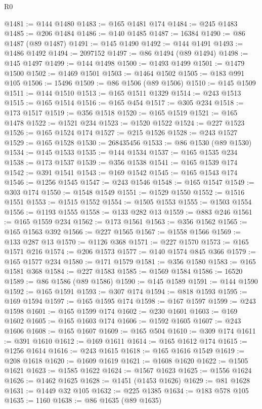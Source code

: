 \begin{lexlean}{R0}
\begin{coremodule}
@1481 := @144 @1480
@1483 := @165 @1481 @174
@1484 := @245 @1483
@1485 := @206 @1484
@1486 := @140 @1485
@1487 := 16384
@1490 := @86 @1487 (@89 @1487)
@1491 := @145 @1490
@1492 := @144 @1491
@1493 := @1486 @1492
@1494 := 2097152
@1497 := @86 @1494 (@89 @1494)
@1498 := @145 @1497
@1499 := @144 @1498
@1500 := @1493 @1499
@1501 := @1479 @1500
@1502 := @1469 @1501
@1503 := @1464 @1502
@1505 := @183 @991 @105
@1506 := 15496
@1509 := @86 @1506 (@89 @1506)
@1510 := @145 @1509
@1511 := @144 @1510
@1513 := @165 @1511 @1329
@1514 := @243 @1513
@1515 := @165 @1514
@1516 := @165 @454
@1517 := @305 @234
@1518 := @173 @1517
@1519 := @356 @1518
@1520 := @165 @1519
@1521 := @165 @1478
@1522 := @1521 @234
@1523 := @1520 @1522
@1524 := @227 @1523
@1526 := @165 @1524 @174
@1527 := @215 @1526
@1528 := @243 @1527
@1529 := @165 @1528
@1530 := 268435456
@1533 := @86 @1530 (@89 @1530)
@1534 := @145 @1533
@1535 := @144 @1534
@1537 := @165 @1535 @234
@1538 := @173 @1537
@1539 := @356 @1538
@1541 := @165 @1539 @174
@1542 := @391 @1541
@1543 := @169 @1542
@1545 := @165 @1543 @174
@1546 := @1256 @1545
@1547 := @243 @1546
@1548 := @165 @1547
@1549 := @303 @174
@1550 := @1548 @1549
@1551 := @1529 @1550
@1552 := @1516 @1551
@1553 := @1515 @1552
@1554 := @1505 @1553
@1555 := @1503 @1554
@1556 := @1193 @1555
@1558 := @133 @282 @13
@1559 := @883 @246
@1561 := @165 @1559 @234
@1562 := @173 @1561
@1563 := @356 @1562
@1565 := @165 @1563 @392
@1566 := @227 @1565
@1567 := @1558 @1566
@1569 := @133 @287 @13
@1570 := @1126 @368
@1571 := @227 @1570
@1573 := @165 @1571 @216
@1574 := @206 @1573
@1577 := @140 @1574 @845 @366
@1579 := @165 @1577 @234
@1580 := @171 @1579
@1581 := @356 @1580
@1583 := @165 @1581 @368
@1584 := @227 @1583
@1585 := @1569 @1584
@1586 := 16520
@1589 := @86 @1586 (@89 @1586)
@1590 := @145 @1589
@1591 := @144 @1590
@1592 := @165 @1591
@1593 := @307 @174
@1594 := @818 @1593
@1595 := @169 @1594
@1597 := @165 @1595 @174
@1598 := @167 @1597
@1599 := @243 @1598
@1601 := @165 @1599 @174
@1602 := @230 @1601
@1603 := @169 @1602
@1605 := @165 @1603 @174
@1606 := @1592 @1605
@1607 := @243 @1606
@1608 := @165 @1607
@1609 := @165 @504
@1610 := @309 @174
@1611 := @391 @1610
@1612 := @169 @1611
@1614 := @165 @1612 @174
@1615 := @1256 @1614
@1616 := @243 @1615
@1618 := @165 @1616 @1549
@1619 := @208 @1618
@1620 := @1609 @1619
@1621 := @1608 @1620
@1622 := @1505 @1621
@1623 := @1585 @1622
@1624 := @1567 @1623
@1625 := @1556 @1624
@1626 := @1462 @1625
@1628 := @1451 (@1453 @1626)
@1629 := @81 @1628
@1631 := @1449 @32 @105
@1632 := @225 @1385
@1634 := @183 @578 @105
@1635 := 1160
@1638 := @86 @1635 (@89 @1635)

\end{coremodule}
\end{lexlean}
